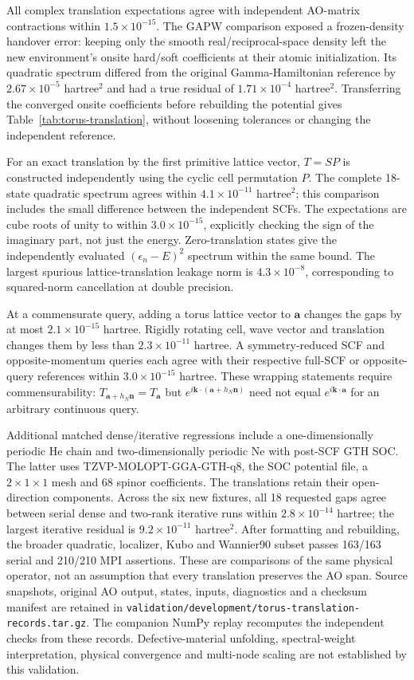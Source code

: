 \documentclass[11pt]{article}
\begin{document}
All complex translation expectations agree with independent
AO-matrix contractions within $1.5\times10^{-15}$. The GAPW
comparison exposed a frozen-density handover error: keeping
only the smooth real/reciprocal-space density left the new
environment's onsite hard/soft coefficients at their atomic
initialization. Its quadratic spectrum differed from the
original Gamma-Hamiltonian reference by
$2.67\times10^{-5}$ hartree$^2$ and had a true residual of
$1.71\times10^{-4}$ hartree$^2$. Transferring the converged
onsite coefficients before rebuilding the potential gives
Table~\ref{tab:torus-translation}, without loosening tolerances
or changing the independent reference.

For an exact translation by the first primitive lattice vector,
$T=SP$ is constructed independently using the cyclic cell
permutation $P$. The complete 18-state quadratic spectrum
agrees within $4.1\times10^{-11}$ hartree$^2$; this comparison
includes the small difference between the independent SCFs.
The expectations are cube roots of unity to within
$3.0\times10^{-15}$, explicitly checking the sign of the
imaginary part, not just the energy. Zero-translation states
give the independently evaluated $(\epsilon_n-E)^2$ spectrum
within the same bound. The largest spurious lattice-translation
leakage norm is $4.3\times10^{-8}$, corresponding to squared-norm
cancellation at double precision.

At a commensurate query, adding a torus lattice vector to
$\bm a$ changes the gaps by at most $2.1\times10^{-15}$ hartree.
Rigidly rotating cell, wave vector and translation changes them
by less than $2.3\times10^{-11}$ hartree. A symmetry-reduced SCF
and opposite-momentum queries each agree with their respective
full-SCF or opposite-query references within
$3.0\times10^{-15}$ hartree. These wrapping statements require
commensurability: $T_{\bm a+h_N\bm n}=T_{\bm a}$ but
$e^{i\bm k\cdot(\bm a+h_N\bm n)}$ need not equal
$e^{i\bm k\cdot\bm a}$ for an arbitrary continuous query.

Additional matched dense/iterative regressions include a
one-dimensionally periodic He chain and two-dimensionally
periodic Ne with post-SCF GTH SOC. The latter uses
TZVP-MOLOPT-GGA-GTH-q8, the SOC potential file, a $2\times1\times1$
mesh and 68 spinor coefficients. The translations retain their
open-direction components. Across the six new fixtures, all
18 requested gaps agree between serial dense and two-rank
iterative runs within $2.8\times10^{-14}$ hartree; the largest
iterative residual is $9.2\times10^{-11}$ hartree$^2$.
After formatting and rebuilding, the broader quadratic,
localizer, Kubo and Wannier90 subset passes 163/163 serial and
210/210 MPI assertions. These are comparisons of the same
physical operator, not an assumption that every translation
preserves the AO span. Source snapshots, original AO output,
states, inputs, diagnostics and a checksum manifest are retained in
\nolinkurl{validation/development/torus-translation-records.tar.gz}.
The companion NumPy replay recomputes the independent checks
from these records. Defective-material unfolding, spectral-weight
interpretation, physical convergence and multi-node scaling are
not established by this validation.
\end{document}
